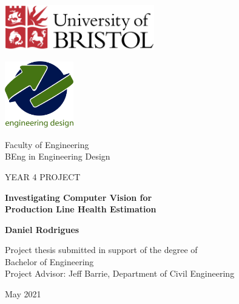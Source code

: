 \documentclass[10pt]{article}
\begin{document}
\begin{titlepage}

\begin{minipage}{0.5\textwidth}
    \begin{flushleft}
    \includegraphics[width=65mm]{images/University_of_Bristol_logo.png}
    \end{flushleft}
\end{minipage}
\begin{minipage}{0.5\textwidth}
    \begin{flushright}
    \includegraphics[width=30mm]{images/Eng_Des_Logo.png}
    \end{flushright}
\end{minipage}

\centering
\vspace*{1.3\baselineskip}

\huge{Faculty of Engineering\\}
\vspace*{0.5\baselineskip}
\huge{BEng in Engineering Design\\}
\vspace*{0.75\baselineskip}

\LARGE{YEAR 4 PROJECT}

\vspace*{\baselineskip}

\LARGE{\textbf{Investigating Computer Vision for \\Production Line Health Estimation
}}
\vspace{1.3\baselineskip}

{\LARGE \textbf{Daniel Rodrigues}}\\

\vspace{1.3\baselineskip}

{\Large{Project thesis submitted in support of the degree of
\\Bachelor of Engineering\\
}}
\vspace{0.75\baselineskip}
{\large{Project Advisor: Jeff Barrie, Department of Civil Engineering
}}

\vspace{0.75\baselineskip}
\large{May 2021}

\end{titlepage}
\end{document}
